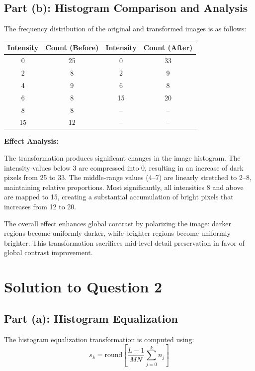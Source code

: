 \documentclass[12pt,a4paper]{article}
\begin{document}
\subsection*{Part (b): Histogram Comparison and Analysis}

The frequency distribution of the original and transformed images is as follows:

\begin{center}
\begin{tabular}{|c|c|c|c|}
\hline
\textbf{Intensity} & \textbf{Count (Before)} & \textbf{Intensity} & \textbf{Count (After)} \\
\hline
0 & 25 & 0 & 33 \\
2 & 8 & 2 & 9 \\
4 & 9 & 6 & 8 \\
6 & 8 & 15 & 20 \\
8 & 8 & -- & -- \\
15 & 12 & -- & -- \\
\hline
\end{tabular}
\end{center}

\textbf{Effect Analysis:}

The transformation produces significant changes in the image histogram. The intensity values below 3 are compressed into 0, resulting in an increase of dark pixels from 25 to 33. The middle-range values (4--7) are linearly stretched to 2--8, maintaining relative proportions. Most significantly, all intensities 8 and above are mapped to 15, creating a substantial accumulation of bright pixels that increases from 12 to 20.

The overall effect enhances global contrast by polarizing the image: darker regions become uniformly darker, while brighter regions become uniformly brighter. This transformation sacrifices mid-level detail preservation in favor of global contrast improvement.

\vspace{1.0cm}
\section*{Solution to Question 2}

\subsection*{Part (a): Histogram Equalization}

The histogram equalization transformation is computed using:
\begin{equation*}
s_k = \text{round}\left[\frac{L - 1}{MN} \sum_{j=0}^{k} n_j\right]
\end{equation*}
\end{document}
